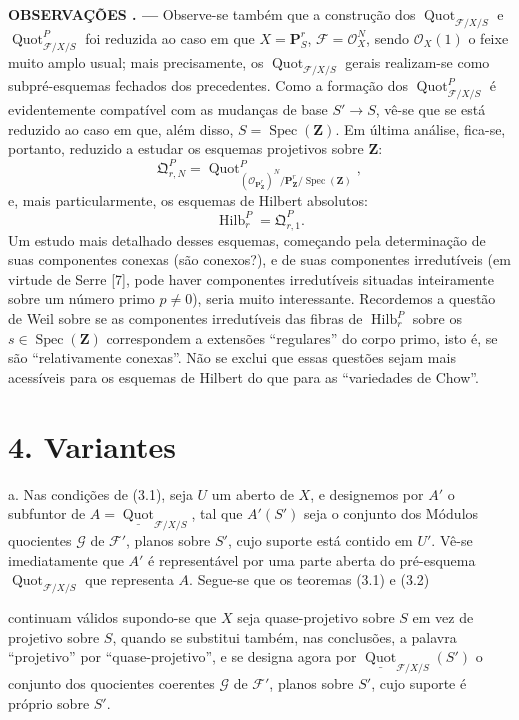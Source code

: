 \documentclass[11pt,twoside,openany]{book}
\numberwithin{equation}{section}
\newcommand{\src}[1]{%
  \phantomsection\hypertarget{src:#1}{}%
  \marginpar{\raggedleft\footnotesize\sffamily #1}%
}
\theoremstyle{plain}
\theoremstyle{definition}
\theoremstyle{remark}
\newcommand{\fsection}[2]{%
  \section*{#1. #2}%
  \addcontentsline{toc}{section}{#1. #2}%
}
\newcommand{\result}[2]{%
  \par\medskip\noindent\textbf{#1%
  \if\relax\detokenize{#2}\relax\else\space#2\fi. ---}\enspace
}
\newcommand{\FgaUnitKey}{frontmatter}
\renewcommand{\src}[1]{%
  \phantomsection\hypertarget{src:\FgaUnitKey:#1}{}%
  \marginpar{\raggedleft\footnotesize\sffamily #1}%
}
\begin{document}
\result{OBSERVAÇÕES}{3.9} Observe-se também que a construção dos
$\operatorname{Quot}_{\mathcal F/X/S}$ e
$\operatorname{Quot}^P_{\mathcal F/X/S}$ foi reduzida ao caso em que
$X=\mathbf P^r_S$, $\mathcal F=\mathcal O_X^N$, sendo $\mathcal O_X(1)$ o
feixe muito amplo usual; mais precisamente, os
$\operatorname{Quot}_{\mathcal F/X/S}$ gerais realizam-se como
subpré-esquemas fechados dos precedentes. Como a formação dos
$\operatorname{Quot}^P_{\mathcal F/X/S}$ é evidentemente compatível com as
mudanças de base $S'\longrightarrow S$, vê-se que se está reduzido ao caso em
que, além disso, $S=\operatorname{Spec}(\mathbf Z)$. Em última análise, fica-se,
portanto, reduzido a estudar os esquemas projetivos sobre $\mathbf Z$:
\[
\mathfrak Q^P_{r,N}=
\operatorname{Quot}^{P}_{(\mathcal O_{\mathbf P^r_{\mathbf Z}})^N/
\mathbf P^r_{\mathbf Z}/\operatorname{Spec}(\mathbf Z)},
\]
e, mais particularmente, os esquemas de Hilbert absolutos:
\[
\operatorname{Hilb}^P_r=\mathfrak Q^P_{r,1}.
\]
Um estudo mais detalhado desses esquemas, começando pela determinação de suas
componentes conexas (são conexos?), e de suas componentes irredutíveis
(em virtude de Serre [7], pode haver componentes irredutíveis situadas
inteiramente sobre um número primo $p\neq0$), seria muito interessante.
Recordemos a questão de Weil sobre se as componentes irredutíveis das fibras de
$\operatorname{Hilb}^P_r$ sobre os $s\in\operatorname{Spec}(\mathbf Z)$
correspondem a extensões ``regulares'' do corpo primo, isto é, se são
``relativamente conexas''. Não se exclui que essas questões sejam mais
acessíveis para os esquemas de Hilbert do que para as ``variedades de Chow''.

\fsection{4}{Variantes}

\noindent a. Nas condições de (3.1), seja $U$ um aberto de $X$, e designemos
por $A'$ o subfuntor de
$A=\underline{\operatorname{Quot}}_{\mathcal F/X/S}$, tal que $A'(S')$ seja
o conjunto dos Módulos quocientes $\mathcal G$ de $\mathcal F'$, planos sobre
$S'$, cujo suporte está contido em $U'$. Vê-se imediatamente que $A'$ é
representável por uma parte aberta do pré-esquema
$\operatorname{Quot}_{\mathcal F/X/S}$ que representa $A$. Segue-se que os
teoremas (3.1) e (3.2)
\src{267}
continuam válidos supondo-se que $X$ seja quase-projetivo sobre $S$ em vez de
projetivo sobre $S$, quando se substitui também, nas conclusões, a palavra
``projetivo'' por ``quase-projetivo'', e se designa agora por
$\underline{\operatorname{Quot}}_{\mathcal F/X/S}(S')$ o conjunto dos
quocientes coerentes $\mathcal G$ de $\mathcal F'$, planos sobre $S'$, cujo
suporte é próprio sobre $S'$.
\end{document}

